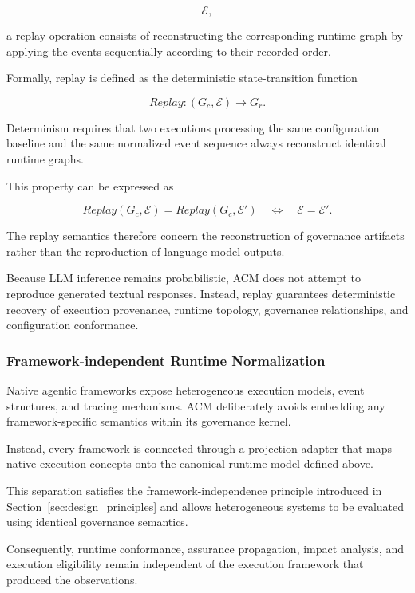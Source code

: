 \documentclass[10pt]{article}
\begin{document}
\[
\mathcal{E},
\]

a replay operation consists of reconstructing the corresponding runtime graph
by applying the events sequentially according to their recorded order.

Formally, replay is defined as the deterministic state-transition function

\[
Replay :
(G_c,\mathcal{E})
\rightarrow
G_r.
\tag{29}
\]

Determinism requires that two executions processing the same configuration
baseline and the same normalized event sequence always reconstruct identical
runtime graphs.

This property can be expressed as

\[
Replay(G_c,\mathcal{E})
=
Replay(G_c,\mathcal{E}')
\quad
\Longleftrightarrow
\quad
\mathcal{E}=\mathcal{E}'.
\tag{30}
\]

The replay semantics therefore concern the reconstruction of governance
artifacts rather than the reproduction of language-model outputs.

Because LLM inference remains probabilistic, ACM does not attempt to reproduce
generated textual responses. Instead, replay guarantees deterministic recovery
of execution provenance, runtime topology, governance relationships, and
configuration conformance.

\subsubsection{Framework-independent Runtime Normalization}

Native agentic frameworks expose heterogeneous execution models, event
structures, and tracing mechanisms. ACM deliberately avoids embedding any
framework-specific semantics within its governance kernel.

Instead, every framework is connected through a projection adapter that maps
native execution concepts onto the canonical runtime model defined above.

This separation satisfies the framework-independence principle introduced in
Section~\ref{sec:design_principles} and allows heterogeneous systems to be
evaluated using identical governance semantics.

Consequently, runtime conformance, assurance propagation, impact analysis,
and execution eligibility remain independent of the execution framework that
produced the observations.
\end{document}
